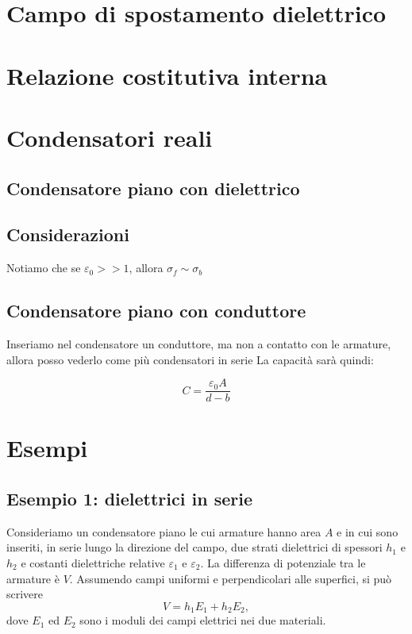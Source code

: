 \documentclass{book}
\begin{document}
\section{Campo di spostamento dielettrico}
\section{Relazione costitutiva interna}
\section{Condensatori reali}

\subsection{Condensatore piano con dielettrico}











\subsection{Considerazioni}




Notiamo che se $\varepsilon_0 >> 1$, allora $\sigma_f \sim \sigma_b$

\subsection{Condensatore piano con conduttore}
Inseriamo nel condensatore un conduttore, ma non a contatto con le armature, allora posso vederlo come più condensatori in serie
La capacità sarà quindi:


$$
C = \frac{\varepsilon_0 A}{d-b}
$$






\section{Esempi}

\subsection*{Esempio 1: dielettrici in serie}

Consideriamo un condensatore piano le cui armature hanno area \(A\) e in cui sono inseriti, in serie lungo la direzione del campo, due strati dielettrici di spessori \(h_1\) e \(h_2\) e costanti dielettriche relative \(\varepsilon_1\) e \(\varepsilon_2\). La differenza di potenziale tra le armature è \(V\). Assumendo campi uniformi e perpendicolari alle superfici, si può scrivere
\[
V = h_1 E_1 + h_2 E_2,
\]
dove \(E_1\) ed \(E_2\) sono i moduli dei campi elettrici nei due materiali.
\end{document}

